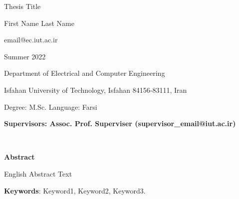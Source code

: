 \thispagestyle{empty}
\begin{latin}
\begin{center}

{\huge Thesis Title}

\vspace{1cm}

{\LARGE{First Name Last Name}}

\vspace{0.2cm}

{\small email@ec.iut.ac.ir}

\vspace{0.5cm}

Summer 2022

\vspace{0.5cm}

Department of Electrical and Computer Engineering

\vspace{0.2cm}

Isfahan University of Technology, Isfahan 84156-83111, Iran

\vspace{0.2cm}

Degree: M.Sc. \hspace*{3cm} Language: Farsi

\vspace{1cm}

{\small\textbf{Supervisors: Assoc. Prof. Superviser (supervisor\_email@iut.ac.ir)}}
\end{center}
~\vfill


\noindent\textbf{Abstract}

\begin{small}
\baselineskip=0.6cm


English Abstract Text


 
\end{small}

\vspace{0.5 cm}

\noindent \textbf{Keywords}:  Keyword1, Keyword2, Keyword3.

\end{latin}
\restoregeometry